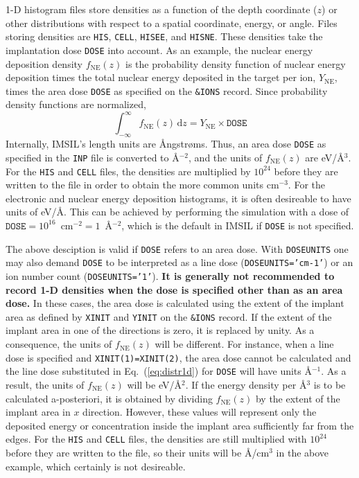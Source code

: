 1-D histogram files store densities as a function of the depth coordinate ($z$)
or other distributions with respect to a spatial coordinate, energy, or angle.
Files storing densities are \texttt{HIS}, \texttt{CELL}, \texttt{HISEE}, and 
\texttt{HISNE}. These densities take the implantation dose \texttt{DOSE} into
account. As an example, the nuclear energy deposition density $f_\mathrm{NE}(z)$
is the probability density function of nuclear energy deposition times the
total nuclear energy deposited in the target per ion, $Y_\mathrm{NE}$, times
the area dose \texttt{DOSE} as specified on the \texttt{\&IONS} record. Since
probability density functions are normalized,
%
\begin{equation}
    \int_{-\infty}^{\infty} f_\mathrm{NE}(z)\,\mathrm{d}z
    = Y_\mathrm{NE} \times \texttt{DOSE}
    \label{eq:distr1d}
\end{equation}
%
Internally, IMSIL's length units are {\AA}ngstr{\o}ms. Thus, an area dose
\texttt{DOSE} as specified in the \texttt{INP} file is converted to
{\AA}$^{-2}$, and the units of $f_\mathrm{NE}(z)$ are eV/{\AA}$^3$. For the
\texttt{HIS} and \texttt{CELL} files, the densities are multiplied by $10^{24}$
before they are written to the file in order to obtain the more common units
cm$^{-3}$. For the electronic and nuclear energy deposition histograms, it is
often desireable to have units of eV/{\AA}. This can be achieved by performing
the simulation with a dose of $\texttt{DOSE} = 10^{16}$~cm$^{-2} =
1$~{\AA}$^{-2}$, which is the default in IMSIL if \texttt{DOSE} is not
specified.

The above desciption is valid if \texttt{DOSE} refers to an area dose.
With \texttt{DOSEUNITS} one may also demand \texttt{DOSE} to be interpreted as
a line dose (\texttt{DOSEUNITS='cm-1'}) or an ion number count
(\texttt{DOSEUNITS='1'}). \textbf{It is generally not recommended to record 1-D
densities when the dose is specified other than as an area dose.} 
In these cases, the area dose is calculated using the
extent of the implant area as defined by \texttt{XINIT} and \texttt{YINIT} on
the \texttt{\&IONS} record. If the extent of the implant area in one of the
directions is zero, it is replaced by unity. As a consequence, the units of
$f_\mathrm{NE}(z)$ will be different. For instance, when a line dose is
specified and \texttt{XINIT(1)=XINIT(2)}, the area dose cannot be calculated and
the line dose substituted in Eq.~(\ref{eq:distr1d}) for \texttt{DOSE} will have
units {\AA}$^{-1}$. As a result, the units of $f_\mathrm{NE}(z)$ will be 
eV/{\AA}$^2$. If the energy density per {\AA}$^3$ is to be calculated
a-posteriori, it is obtained by dividing $f_\mathrm{NE}(z)$ by the extent of the
implant area in $x$ direction. However, these values will represent only the
deposited energy or concentration inside the implant area sufficiently far from
the edges.  For the \texttt{HIS} and \texttt{CELL} files, the densities are
still multiplied with $10^{24}$ before they are written to the file, so their
units will be {\AA}/cm$^3$ in the above example, which certainly is not desireable.

